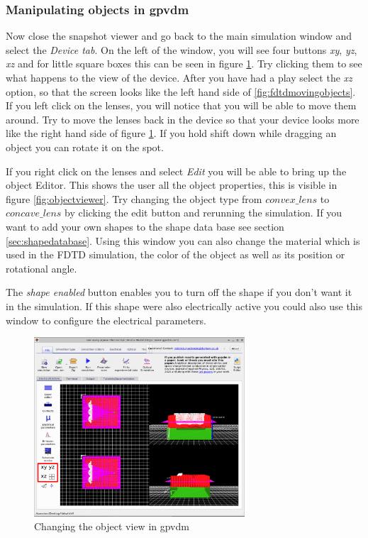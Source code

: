 \subsubsection{Manipulating objects in gpvdm}
Now close the snapshot viewer and go back to the main simulation window and select the \emph{Device tab}.  On the left of the window, you will see four buttons \emph{xy}, \emph{yz}, \emph{xz} and for little square boxes this can be seen in figure \ref{fig:fdtdmainwindow}. Try clicking them to see what happens to the view of the device.  After you have had a play select the \emph{xz} option, so that the screen looks like the left hand side of \ref{fig:fdtdmovingobjects}.  If you left click on the lenses, you will notice that you will be able to move them around. Try to move the lenses back in the device so that your device looks more like the right hand side of figure \ref{fig:fdtdmainwindow}.  If you hold shift down while dragging an object you can rotate it on the spot.

If you right click on the lenses and select \emph{Edit} you will be able to bring up the object Editor.  This shows the user all the object properties, this is visible in figure \ref{fig:objectviewer}. Try changing the object type from $convex\_lens$ to $concave\_ lens$ by clicking the edit button and rerunning the simulation.  If you want to add your own shapes to the shape data base see section \ref{sec:shapedatabase}. Using this window you can also change the material which is used in the FDTD simulation, the color of the object as well as its position or rotational angle.

The \emph{shape enabled} button enables you to turn off the shape if you don't want it in the simulation. If this shape were also electrically active you could also use this window to configure the electrical parameters.

 
\begin{figure}[H]
\centering
\includegraphics[width=0.7\textwidth]{./images/fdtd_7.png}
\caption{Changing the object view in gpvdm}
\label{fig:fdtdmainwindow}
\end{figure}

